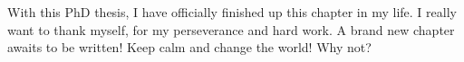 With this PhD thesis, I have officially finished up this chapter in my life.
I really want to thank myself, for my perseverance and hard work. 
A brand new chapter awaits to be written!
Keep calm and change the world! Why not?

